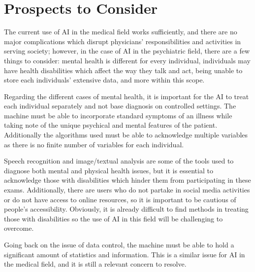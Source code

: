 \documentclass[11pt,technote,twocolumn]{IEEEtran}
\begin{document}
\section{Prospects to Consider}
The current use of AI in the medical field works sufficiently, and there are no major complications which disrupt physicians' responsibilities and activities in serving society; however, in the case of AI in the psychiatric field, there are a few things to consider: mental health is different for every individual, individuals may have health disabilities which affect the way they talk and act, being unable to store each individuals' extensive data, and more within this scope.
\par
Regarding the different cases of mental health, it is important for the AI to treat each individual separately and not base diagnosis on controlled settings. The machine must be able to incorporate standard symptoms of an illness while taking note of the unique psychical and mental features of the patient. Additionally the algorithms used must be able to acknowledge multiple variables as there is no finite number of variables for each individual.
\par
Speech recognition and image/textual analysis are some of the tools used to diagnose both mental and physical health issues, but it is essential to acknowledge those with disabilities which hinder them from participating in these exams. Additionally, there are users who do not partake in social media activities or do not have access to online resources, so it is important to be cautious of people's accessibility. Obviously, it is already difficult to find methods in treating those with disabilities so the use of AI in this field will be challenging to overcome.
\par
Going back on the issue of data control, the machine must be able to hold a significant amount of statistics and information. This is a similar issue for AI in the medical field, and it is still a relevant concern to resolve.
\end{document}
